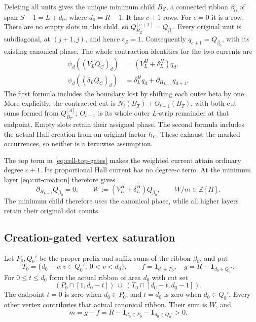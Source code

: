 \documentclass[11pt,a4paper]{amsart}
\numberwithin{equation}{section}
\theoremstyle{plain}
\theoremstyle{definition}
\newcommand{\Z}{\mathbb Z}
\newcommand{\one}{\mathbf1}
\begin{document}
Deleting all units gives the unique minimum child \(B_Z\), a connected
ribbon \(\beta_0\) of span \(S-1=L+d_0\), where \(d_0=R-1\).  It has \(c+1\) rows.
For \(c=0\) it is a row.  There are no empty slots in this child, so
\(Q_{B_Z}^{[c+1]}=Q_{\beta_0}\).  Every original unit is subdiagonal,
at \((j+1,j)\), and hence \(\epsilon_Z=1\).  Consequently
\(q_{c+1}=Q_{\beta_0}\), with its existing canonical phase.
The whole contraction identities for the two currents are
\begin{equation}\label{eq:cut-creation}
 \begin{aligned}
 \psi_d((V_LQ_C)_d)&=(V_L^H+\delta_L^H)q_d,\\
 \psi_d((\delta_LQ_C)_d)&=\delta_L^Hq_d+
                              \partial_{H_{L-1}}q_{d+1}.
 \end{aligned}
\end{equation}
The first formula includes the boundary lost by shifting each outer beta
by one.  More explicitly, the contracted cut is
\(N_t(B_T)+O_{t-1}(B_T)\), with both cut sums formed from
\(Q_{B_T}^{[d]}\); \(O_{t-1}\) is its whole outer \(L\)-strip remainder
at that endpoint.  Empty slots retain their assigned phase.
The second formula includes the actual Hall
creation from an original factor \(h_L\).  These exhaust the marked
occurrences, so neither is a termwise assumption.

The top term in \eqref{eq:cell-top-gates} makes the weighted current attain
ordinary degree \(c+1\).  Its proportional Hall current has no degree-\(c\)
term.  At the minimum layer \eqref{eq:cut-creation} therefore gives
\begin{equation}\label{eq:ribbon-vertex-gates}
 \partial_{H_{L-1}}Q_{\beta_0}=0,
 \qquad W:=(V_L^H+\delta_L^H)Q_{\beta_0},\qquad W/m\in\Z[H].
\end{equation}
The minimum child therefore uses the canonical phase, while all higher
layers retain their original slot counts.

\subsection{Creation-gated vertex saturation}

Let \(P_0,Q_0'\) be the proper prefix and suffix sums of the ribbon
\(\beta_0\), and put
\[
 T_0=\{d_0-v:v\in Q_0',\ 0<v<d_0\},\qquad
 f=\one_{d_0\in P_0},\quad g=R-\one_{d_0\in Q_0'}.
\]
For \(0\le t\le d_0\) form the actual ribbon of area \(d_0\) with cut set
\begin{equation}\label{eq:vertex-mask}
 (P_0\cap[1,d_0-t])\ \cup\ (T_0\cap[d_0-t,d_0-1]).
\end{equation}
The endpoint \(t=0\) is zero when \(d_0\in P_0\), and \(t=d_0\) is zero when
\(d_0\in Q_0'\).  Every other vertex contributes that actual canonical
ribbon.  Their sum is \(W\), and
\begin{equation}\label{eq:vertex-count}
 m=g-f=R-\one_{d_0\in P_0}-\one_{d_0\in Q_0'}>0.
\end{equation}
\end{document}
